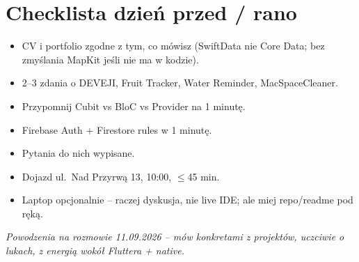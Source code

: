 \documentclass[11pt,a4paper]{article}
\begin{document}
\section{Checklista dzień przed / rano}

\begin{itemize}[leftmargin=*]
  \item CV i portfolio zgodne z tym, co mówisz (SwiftData nie Core Data; bez zmyślania MapKit jeśli nie ma w kodzie).
  \item 2--3 zdania o DEVEJI, Fruit Tracker, Water Reminder, MacSpaceCleaner.
  \item Przypomnij Cubit vs BloC vs Provider na 1 minutę.
  \item Firebase Auth + Firestore rules w 1 minutę.
  \item Pytania do nich wypisane.
  \item Dojazd ul.\ Nad Przyrwą 13, 10:00, $\le$45 min.
  \item Laptop opcjonalnie -- raczej dyskusja, nie live IDE; ale miej repo/readme pod ręką.
\end{itemize}

\vspace{1em}
\noindent\textit{Powodzenia na rozmowie 11.09.2026 -- mów konkretami z projektów, uczciwie o lukach, z energią wokół Fluttera + native.}
\end{document}
